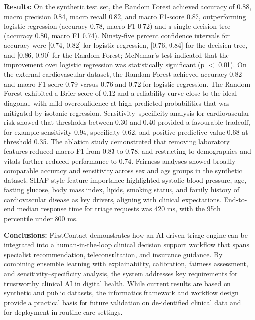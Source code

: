 \documentclass[12pt]{article}
\begin{document}
\bigskip

\textbf{Results:} On the synthetic test set, the Random Forest achieved accuracy of 0.88, macro precision 0.84, macro recall 0.82, and macro F1-score 0.83, outperforming logistic regression (accuracy 0.78, macro F1 0.72) and a single decision tree (accuracy 0.80, macro F1 0.74). Ninety-five percent confidence intervals for accuracy were [0.74, 0.82] for logistic regression, [0.76, 0.84] for the decision tree, and [0.86, 0.90] for the Random Forest; McNemar's test indicated that the improvement over logistic regression was statistically significant (p $<$ 0.01). On the external cardiovascular dataset, the Random Forest achieved accuracy 0.82 and macro F1-score 0.79 versus 0.76 and 0.72 for logistic regression. The Random Forest exhibited a Brier score of 0.12 and a reliability curve close to the ideal diagonal, with mild overconfidence at high predicted probabilities that was mitigated by isotonic regression. Sensitivity--specificity analysis for cardiovascular risk showed that thresholds between 0.30 and 0.40 provided a favourable tradeoff, for example sensitivity 0.94, specificity 0.62, and positive predictive value 0.68 at threshold 0.35. The ablation study demonstrated that removing laboratory features reduced macro F1 from 0.83 to 0.78, and restricting to demographics and vitals further reduced performance to 0.74. Fairness analyses showed broadly comparable accuracy and sensitivity across sex and age groups in the synthetic dataset. SHAP-style feature importance highlighted systolic blood pressure, age, fasting glucose, body mass index, lipids, smoking status, and family history of cardiovascular disease as key drivers, aligning with clinical expectations. End-to-end median response time for triage requests was 420 ms, with the 95th percentile under 800 ms.

\bigskip

\textbf{Conclusions:} FirstContact demonstrates how an AI-driven triage engine can be integrated into a human-in-the-loop clinical decision support workflow that spans specialist recommendation, teleconsultation, and insurance guidance. By combining ensemble learning with explainability, calibration, fairness assessment, and sensitivity--specificity analysis, the system addresses key requirements for trustworthy clinical AI in digital health. While current results are based on synthetic and public datasets, the informatics framework and workflow design provide a practical basis for future validation on de-identified clinical data and for deployment in routine care settings.
\end{document}
